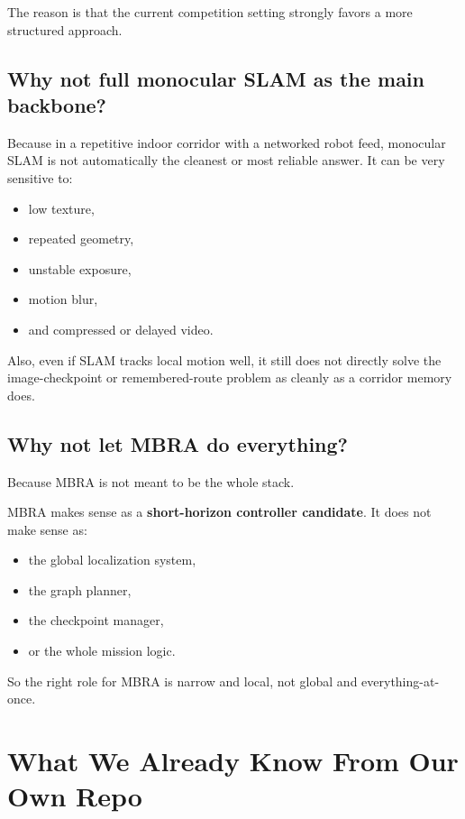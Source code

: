 \documentclass[11pt,a4paper]{article}
\begin{document}
The reason is that the current competition setting strongly favors a more
structured approach.

\subsection{Why not full monocular SLAM as the main backbone?}

Because in a repetitive indoor corridor with a networked robot feed, monocular
SLAM is not automatically the cleanest or most reliable answer.  It can be very
sensitive to:

\begin{itemize}[nosep]
  \item low texture,
  \item repeated geometry,
  \item unstable exposure,
  \item motion blur,
  \item and compressed or delayed video.
\end{itemize}

Also, even if SLAM tracks local motion well, it still does not directly solve
the image-checkpoint or remembered-route problem as cleanly as a corridor memory
does.

\subsection{Why not let MBRA do everything?}

Because MBRA is not meant to be the whole stack.

MBRA makes sense as a \textbf{short-horizon controller candidate}.  It does not
make sense as:

\begin{itemize}[nosep]
  \item the global localization system,
  \item the graph planner,
  \item the checkpoint manager,
  \item or the whole mission logic.
\end{itemize}

So the right role for MBRA is narrow and local, not global and everything-at-once.

\section{What We Already Know From Our Own Repo}
\end{document}
